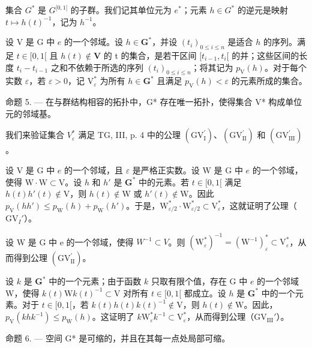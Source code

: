 集合 \(G^{*}\) 是 \(G^{[0,1[}\) 的子群。我们记其单位元为 \(e^{*}\)；元素 \(h \in G^{*}\) 的逆元是映射 \(t \mapsto h(t)^{-1}\)，记为 \(h^{-1}\)。

设 V 是 G 中 \(e\) 的一个邻域。设 \(h \in \mathbf{G}^*\)，并设 \((t_i)_{0 \leqslant i \leqslant n}\) 是适合 \(h\) 的序列。满足 \(t \in [0,1[\) 且 \(h(t) \notin \mathbf{V}\) 的 t 的集合，是若干区间 \([t_{i-1}, t_i[\) 的并；这些区间的长度 \(t_i - t_{i-1}\) 之和不依赖于所选的序列 \((t_i)_{0 \leqslant i \leqslant n}\)；将其记为 \(p_{\mathrm{V}}(h)\)。对于每个实数 \(\varepsilon\)，若 \(\varepsilon > 0\)，记 \(\mathrm{V}_{\varepsilon}^*\) 为所有 \(h \in \mathbf{G}^*\) 且满足 \(p_{\mathrm{V}}(h) < \varepsilon\) 的元素所成的集合。

命题 5. --- 在与群结构相容的拓扑中，G* 存在唯一拓扑，使得集合 V* 构成单位元的邻域基。

我们来验证集合 \(V_{\varepsilon}^{*}\) 满足 TG, III, p. 4 中的公理 \((\mathrm{GV}_{\mathrm{I}}^{\prime})\)、\((\mathrm{GV}_{\mathrm{II}}^{\prime})\) 和 \((\mathrm{GV}_{\mathrm{III}}^{\prime})\)。

设 V 是 G 中 \(e\) 的一个邻域，且 \(\varepsilon\) 是严格正实数。设 W 是 G 中 \(e\) 的一个邻域，使得 \(\mathrm{W} \cdot \mathrm{W} \subset \mathrm{V}\)。设 \(h\) 和 \(h'\) 是 \(\mathbf{G}^*\) 中的元素。若 \(t \in [0,1[\) 满足 \(h(t)h'(t) \notin \mathrm{V}\)，则 \(h(t) \notin \mathrm{W}\) 或 \(h'(t) \notin \mathrm{W}\)。因此 \(p_{\mathrm{V}}(hh') \leqslant p_{\mathrm{W}}(h) + p_{\mathrm{W}}(h')\)。于是，\(\mathrm{W}_{\varepsilon/2}^* \cdot \mathrm{W}_{\varepsilon/2}^* \subset \mathrm{V}_{\varepsilon}^*\)，这就证明了公理（\(\mathrm{GV}_I'\)）。

设 W 是 G 中 e 的一个邻域，使得 \(W^{-1} \subset V\)。则 \((\mathrm{W}_{\varepsilon}^{*})^{-1} = (\mathrm{W}^{-1})_{\varepsilon}^{*} \subset \mathrm{V}_{\varepsilon}^{*}\)，从而得到公理 \((\mathrm{GV}_{\mathrm{II}}^{\prime})\)。

设 \(k\) 是 \(\mathbf{G}^*\) 中的一个元素；由于函数 \(k\) 只取有限个值，存在 G 中 \(e\) 的一个邻域 W，使得 \(k(t)\mathrm{W}k(t)^{-1}\subset \mathrm{V}\) 对所有 \(t\in [0,1[\) 都成立。设 \(h\) 是 \(\mathbf{G}^*\) 中的一个元素。对于 \(t\in [0,1[\)，若 \(k(t)h(t)k(t)^{-1}\not\in\mathrm{V}\)，则 \(h(t)\not\in\mathrm{W}\)。因此，\(p_{\mathrm{V}}(khk^{-1})\leqslant p_{\mathrm{W}}(h)\)。这证明了 \(k\mathrm{W}_{\varepsilon}^{*}k^{-1}\subset\mathrm{V}_{\varepsilon}^{*}\)，从而得到公理（\(\mathrm{GV}_{\mathrm{III}}'\)）。

命题 6. --- 空间 G* 是可缩的，并且在其每一点处局部可缩。

